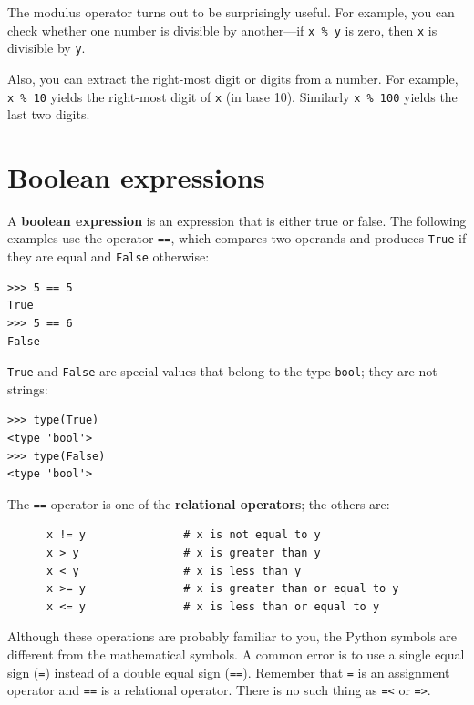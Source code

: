 \documentclass[10pt]{book}
\begin{document}
The modulus operator turns out to be surprisingly useful.  For
example, you can check whether one number is divisible by another---if
{\tt x \% y} is zero, then {\tt x} is divisible by {\tt y}.

Also, you can extract the right-most digit
or digits from a number.  For example, {\tt x \% 10} yields the
right-most digit of {\tt x} (in base 10).  Similarly {\tt x \% 100}
yields the last two digits.


\section{Boolean expressions}

A {\bf boolean expression} is an expression that is either true
or false.  The following examples use the 
operator {\tt ==}, which compares two operands and produces
{\tt True} if they are equal and {\tt False} otherwise:

\begin{verbatim}
>>> 5 == 5
True
>>> 5 == 6
False
\end{verbatim}
%
{\tt True} and {\tt False} are special
values that belong to the type {\tt bool}; they are not strings:

\begin{verbatim}
>>> type(True)
<type 'bool'>
>>> type(False)
<type 'bool'>
\end{verbatim}
%
The {\tt ==} operator is one of the {\bf relational operators}; the
others are:

\begin{verbatim}
      x != y               # x is not equal to y
      x > y                # x is greater than y
      x < y                # x is less than y
      x >= y               # x is greater than or equal to y
      x <= y               # x is less than or equal to y
\end{verbatim}
%
Although these operations are probably familiar to you, the Python
symbols are different from the mathematical symbols.  A common error
is to use a single equal sign ({\tt =}) instead of a double equal sign
({\tt ==}).  Remember that {\tt =} is an assignment operator and
{\tt ==} is a relational operator.   There is no such thing as
{\tt =<} or {\tt =>}.
\end{document}
